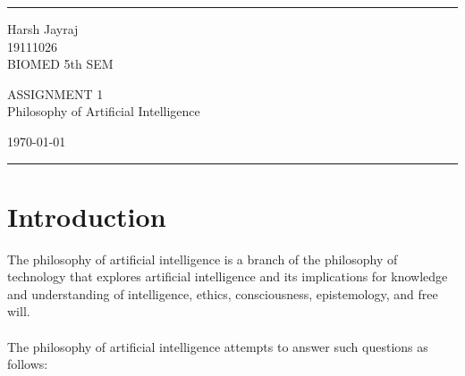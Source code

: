 \documentclass[a4paper]{article}
\begin{document}
    
    
    \fancyhead[C]{}
    \hrule \medskip %
    \begin{minipage}{0.295\textwidth} 
    \raggedright
    \footnotesize
    Harsh Jayraj\hfill\\   
    19111026\hfill\\
    BIOMED 5th SEM
    \end{minipage}
    \begin{minipage}{0.4\textwidth} 
    \centering 
    \large 
    ASSIGNMENT 1\\
    \normalsize 
    Philosophy of Artificial Intelligence\\ 
    \end{minipage}
    \begin{minipage}{0.295\textwidth} 
    \raggedleft
    \today\hfill\\
    \end{minipage}
    \medskip\hrule 
    \bigskip
    
    
    \section{Introduction}
    The philosophy of artificial intelligence is a branch of the philosophy of technology that explores artificial intelligence and its implications for knowledge and understanding of intelligence, ethics, consciousness, epistemology, and free will.
    \\
    \\
    The philosophy of artificial intelligence attempts to answer such questions as follows:
    
\end{document}
